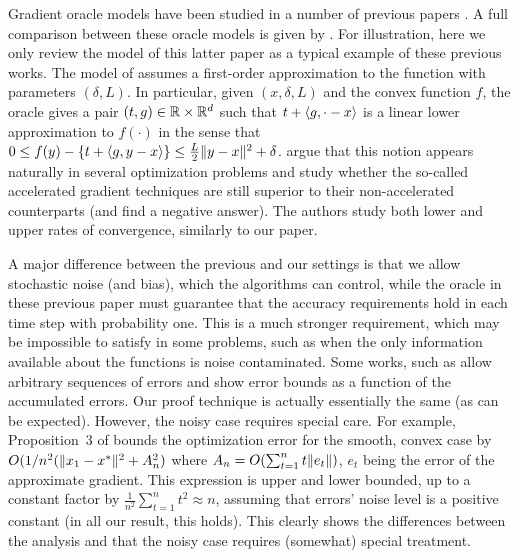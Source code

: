 Gradient oracle models have been studied in a number of previous papers 
\citep{dAsp08,Baes09,SchRoBa11,DeGliNe14}.
A full comparison between these oracle models is given by \cite{DeGliNe14}.
For illustration, here we only review the model of this latter paper as a typical example of these previous works.
The model of \cite{DeGliNe14} assumes a first-order approximation to the function
with parameters $(\delta,L)$. In particular, 
given $(x,\delta,L)$ and the convex function $f$, 
the oracle gives a pair $(t,g)\in \mathbb{R} \times \mathbb{R}^d$
such that $t + \langle g,\cdot-x \rangle$ is a linear lower approximation to $f(\cdot)$ in the sense that 
$0\le f(y) - \left\{ t+ \langle g,y-x \rangle\right\} \le \frac{L}{2} \|y-x\|^2 + \delta$.
\cite{DeGliNe14} argue that this notion appears naturally in several optimization problems and study whether the so-called accelerated gradient techniques are still superior to their non-accelerated counterparts (and find a negative answer).
The authors study both lower and upper rates of convergence, similarly to our paper.


A major difference between the previous and our settings is that we allow stochastic noise (and bias), which the algorithms can control, while the oracle in these previous paper must guarantee that the accuracy requirements hold in each time step
with probability one.
This is a much stronger requirement, which may be impossible to satisfy in some problems, such as when 
the only information available about the functions is noise contaminated.
Some works, such as \citet{SchRoBa11} allow arbitrary sequences of errors and show error bounds as a function
of the accumulated errors. 
Our proof technique is actually essentially the same (as can be expected).
However, the noisy case requires special care. For example, Proposition~3 of
\citet{SchRoBa11}  bounds the optimization error for the smooth, convex case by 
$O(1/n^2 ( \|x_1-x^*\|^2 + A_n^2 )$ where $A_n = O( \sum_{t=1}^n t \|e_t\|)$, $e_t$ being the error of the approximate gradient. This expression is upper and lower bounded, up to a constant factor by
 $\frac{1}{n^2} \sum_{t=1}^n t^2 \approx n$,
assuming that errors' noise level is a positive constant (in all our result, this holds).
This clearly shows the differences between the analysis and that the noisy case requires (somewhat) special treatment.

